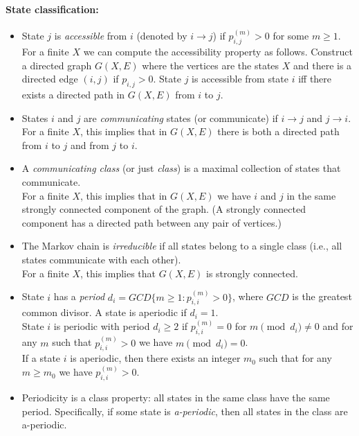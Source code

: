 \paragraph{State classification:}

\begin{itemize}
\item State $j$ is \textit{accessible} from $i$  (denoted by $i \to j$) if $p_{i,j}^{(m)} > 0$ for some $m \ge
1$.\\
For a finite $X$  we can compute the accessibility property as
follows. Construct a directed graph $G(X,E)$ where the vertices are
the states $X$ and there is a directed edge $(i,j)$ if $p_{i,j}>0$.
State $j$ is accessible from state $i$ iff there exists a directed
path in $G(X,E)$ from $i$ to $j$.
\item States $i$ and $j$ are \textit{communicating} states (or communicate) if $i \to j$ and $j \to
i$.\\
For a finite $X$, this implies that in $G(X,E)$ there is both a
directed path from $i$ to $j$ and from $j$ to $i$.
\item A \textit{communicating class} (or just
\emph{class}) is a maximal collection of states that communicate.\\
For a finite $X$, this implies that in $G(X,E)$ we have $i$ and $j$
in the same strongly connected component of the graph. (A strongly
connected component has a directed path between any pair of
vertices.)
\item The Markov chain is
\textit{irreducible} if all states belong to a single class (i.e.,
all states communicate with each other).\\
For a finite $X$, this implies that $G(X,E)$ is strongly
connected.
\item
State $i$ has a \textit{period} $d_i=GCD \{m\geq
1:p_{i,i}^{(m)}>0\}$, where $GCD$ is the greatest common divisor. A
state is aperiodic if $d_i=1$.\\
State $i$ is periodic with period $d_i \ge 2$ if  $p_{i,i}^{(m)} =
0$ for $m \pmod {d_i} \neq 0$ and for any $m$ such that
$p_{i,i}^{(m)} > 0$ we have $m \pmod {d_i} =0$.\\
If a state $i$ is aperiodic, then there exists an integer $m_0$ such
that for any $m\geq m_0$ we have $p_{i,i}^{(m)}>0$.
\item
Periodicity is a class property: all states in the same class
have the same period. Specifically, if some state is
\textit{a-periodic},
then all states in the class are a-periodic.\\

\end{itemize}
